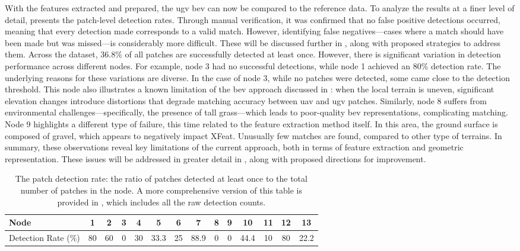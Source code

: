 With the features extracted and prepared, the \gls{ugv} \gls{bev} can now be compared to the reference data.
To analyze the results at a finer level of detail,  presents the patch-level detection rates.
Through manual verification, it was confirmed that no false positive detections occurred, meaning that every detection made corresponds to a valid match.
However, identifying false negatives---cases where a match should have been made but was missed---is considerably more difficult.
These will be discussed further in , along with proposed strategies to address them.
Across the dataset, 36.8\% of all patches are successfully detected at least once.
However, there is significant variation in detection performance across different nodes.
For example, node 3 had no successful detections, while node 1 achieved an 80\% detection rate.
The underlying reasons for these variations are diverse.
In the case of node 3, while no patches were detected, some came close to the detection threshold.
This node also illustrates a known limitation of the \gls{bev} approach discussed in :
when the local terrain is uneven, significant elevation changes introduce distortions that degrade matching accuracy between \gls{uav} and \gls{ugv} patches.
Similarly, node 8 suffers from environmental challenges---specifically, the presence of tall grass---which leads to poor-quality
\gls{bev} representations, complicating matching.
Node 9 highlights a different type of failure, this time related to the feature extraction method itself.
In this area, the ground surface is composed of gravel, which appears to negatively impact XFeat.
Unusually few matches are found, compared to other type of terrains.
In summary, these observations reveal key limitations of the current approach, both in terms of feature extraction and geometric representation.
These issues will be addressed in greater detail in , along with proposed directions for improvement.

\begin{table}[ht!]
    \centering
    \begin{tabular}{|>{\raggedright\arraybackslash}p{2.5cm}|c|c|c|c|c|c|c|c|c|c|c|c|c|}
        \hline
        Node                & 1  & 2  & 3 & 4  & 5    & 6  & 7    & 8 & 9 & 10   & 11 & 12 & 13   \\ \hline
        Detection Rate (\%) & 80 & 60 & 0 & 30 & 33.3 & 25 & 88.9 & 0 & 0 & 44.4 & 10 & 80 & 22.2 \\ \hline
    \end{tabular}
    \caption{The patch detection rate: the ratio of patches detected at least once to the total number of patches in the node.
    A more comprehensive version of this table is provided in , which includes all the raw detection counts.}
    \label{tab:montmorency:patch_detection}
\end{table}

